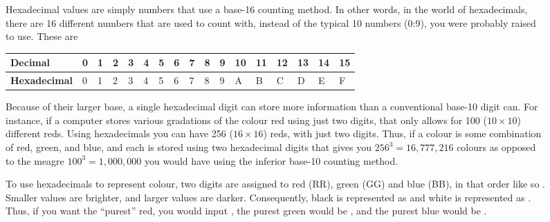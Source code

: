 \begin{figure}
    \centering
\begin{mdframed}[style = miscFrame, frametitle = Box 2.2: Hexadecimal Notation for Colours]

Hexadecimal values are simply numbers that use a base-16 counting method. In other words, in the world of hexadecimals, there are 16 different numbers that are used to count with, instead of the typical 10 numbers (0:9), you were probably raised to use. These are 

\vspace{1em}

\begin{table}[H]
\centering
\begin{tabular}{|l|l|l|l|l|l|l|l|l|l|l|l|l|l|l|l|l|}
\hline
\textbf{Decimal}     & 0 & 1 & 2 & 3 & 4 & 5 & 6 & 7 & 8 & 9 & 10 & 11 & 12 & 13 & 14 & 15 \\ \hline
\textbf{Hexadecimal} & 0 & 1 & 2 & 3 & 4 & 5 & 6 & 7 & 8 & 9 & A  & B  & C  & D  & E  & F  \\ \hline
\end{tabular}
\end{table}

\vspace{1em}

\noindent
Because of their larger base, a single hexadecimal digit can store more information than a conventional base-10 digit can.  For instance, if a computer stores various gradations of the colour red using just two digits, that only allows for 100 ($10 \times 10$) different reds. Using hexadecimals you can have 256 ($16 \times 16$) reds, with just two digits.  Thus, if a colour is some combination of red, green, and blue, and each is stored using two hexadecimal digits that gives you $256^3 = 16,777,216$ colours as opposed to the meagre $100^3 = 1,000,000$ you would have using the inferior base-10 counting method.

\vspace{1em}

To use hexadecimals to represent colour, two digits are assigned to red (RR), green (GG) and blue (BB), in that order like so .  Smaller values are brighter, and larger values are darker.  Consequently, black is represented as  and white is represented as . Thus, if you want the ``purest'' red, you would input , the purest green would be , and the purest blue would be .
\end{mdframed}
\end{figure}

